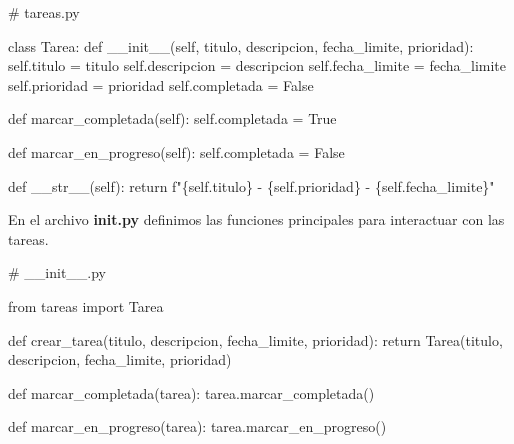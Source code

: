 \documentclass[
  a4paper,
  DIV=11,
  numbers=noendperiod,
  onepage,
  openany]{scrreprt}
\newenvironment{Shaded}{\begin{snugshade}}{\end{snugshade}}
\newcommand{\CommentTok}[1]{\textcolor[rgb]{0.37,0.37,0.37}{#1}}
\newcommand{\ControlFlowTok}[1]{\textcolor[rgb]{0.00,0.23,0.31}{#1}}
\newcommand{\FunctionTok}[1]{\textcolor[rgb]{0.28,0.35,0.67}{#1}}
\newcommand{\ImportTok}[1]{\textcolor[rgb]{0.00,0.46,0.62}{#1}}
\newcommand{\KeywordTok}[1]{\textcolor[rgb]{0.00,0.23,0.31}{#1}}
\newcommand{\NormalTok}[1]{\textcolor[rgb]{0.00,0.23,0.31}{#1}}
\newcommand{\OperatorTok}[1]{\textcolor[rgb]{0.37,0.37,0.37}{#1}}
\newcommand{\SpecialCharTok}[1]{\textcolor[rgb]{0.37,0.37,0.37}{#1}}
\newcommand{\SpecialStringTok}[1]{\textcolor[rgb]{0.13,0.47,0.30}{#1}}
\newcommand{\VariableTok}[1]{\textcolor[rgb]{0.07,0.07,0.07}{#1}}
\begin{document}
\begin{Shaded}
\begin{Highlighting}[]
\CommentTok{\# tareas.py}

\KeywordTok{class}\NormalTok{ Tarea:}
    \KeywordTok{def} \FunctionTok{\_\_init\_\_}\NormalTok{(}\VariableTok{self}\NormalTok{, titulo, descripcion, fecha\_limite, prioridad):}
        \VariableTok{self}\NormalTok{.titulo }\OperatorTok{=}\NormalTok{ titulo}
        \VariableTok{self}\NormalTok{.descripcion }\OperatorTok{=}\NormalTok{ descripcion}
        \VariableTok{self}\NormalTok{.fecha\_limite }\OperatorTok{=}\NormalTok{ fecha\_limite}
        \VariableTok{self}\NormalTok{.prioridad }\OperatorTok{=}\NormalTok{ prioridad}
        \VariableTok{self}\NormalTok{.completada }\OperatorTok{=} \VariableTok{False}

    \KeywordTok{def}\NormalTok{ marcar\_completada(}\VariableTok{self}\NormalTok{):}
        \VariableTok{self}\NormalTok{.completada }\OperatorTok{=} \VariableTok{True}

    \KeywordTok{def}\NormalTok{ marcar\_en\_progreso(}\VariableTok{self}\NormalTok{):}
        \VariableTok{self}\NormalTok{.completada }\OperatorTok{=} \VariableTok{False}

    \KeywordTok{def} \FunctionTok{\_\_str\_\_}\NormalTok{(}\VariableTok{self}\NormalTok{):}
        \ControlFlowTok{return} \SpecialStringTok{f"}\SpecialCharTok{\{}\VariableTok{self}\SpecialCharTok{.}\NormalTok{titulo}\SpecialCharTok{\}}\SpecialStringTok{ {-} }\SpecialCharTok{\{}\VariableTok{self}\SpecialCharTok{.}\NormalTok{prioridad}\SpecialCharTok{\}}\SpecialStringTok{ {-} }\SpecialCharTok{\{}\VariableTok{self}\SpecialCharTok{.}\NormalTok{fecha\_limite}\SpecialCharTok{\}}\SpecialStringTok{"}
\end{Highlighting}
\end{Shaded}

En el archivo \textbf{\textbf{init}.py} definimos las funciones
principales para interactuar con las tareas.

\begin{Shaded}
\begin{Highlighting}[]
\CommentTok{\# \_\_init\_\_.py}

\ImportTok{from}\NormalTok{ tareas }\ImportTok{import}\NormalTok{ Tarea}

\KeywordTok{def}\NormalTok{ crear\_tarea(titulo, descripcion, fecha\_limite, prioridad):}
    \ControlFlowTok{return}\NormalTok{ Tarea(titulo, descripcion, fecha\_limite, prioridad)}

\KeywordTok{def}\NormalTok{ marcar\_completada(tarea):}
\NormalTok{    tarea.marcar\_completada()}

\KeywordTok{def}\NormalTok{ marcar\_en\_progreso(tarea):}
\NormalTok{    tarea.marcar\_en\_progreso()}
\end{Highlighting}
\end{Shaded}
\end{document}
